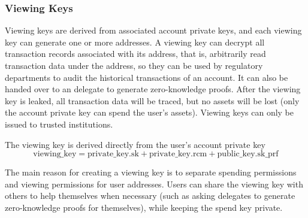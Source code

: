 \subsubsection{Viewing Keys}\label{section: viewing-keys}

Viewing keys are derived from associated account private keys, and each viewing key can generate one or more addresses. A viewing key can decrypt all transaction records associated with its address, that is, arbitrarily read transaction data under the address, so they can be used by regulatory departments to audit the historical transactions of an account. It can also be handed over to an delegate to generate zero-knowledge proofs. After the viewing key is leaked, all transaction data will be traced, but no assets will be lost (only the account private key can spend the user's assets). Viewing keys can only be issued to trusted institutions.

The viewing key is derived directly from the user's account private key
\[ \mathrm{viewing\_key} = \mathrm{private\_key.sk} + \mathrm{private\_key.rcm} + \mathrm{public\_key.sk\_prf} \]

The main reason for creating a viewing key is to separate spending permissions and viewing permissions for user addresses. Users can share the viewing key with others to help themselves when necessary (such as asking delegates to generate zero-knowledge proofs for themselves), while keeping the spend key private.
